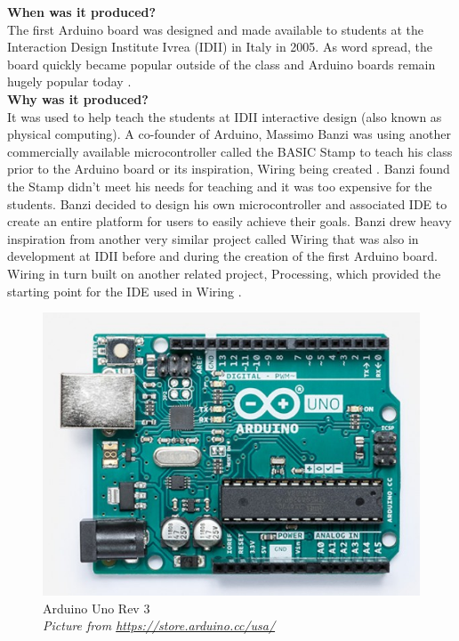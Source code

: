\textbf{When was it produced?}\\
The first Arduino board was designed and made available to students at the Interaction Design Institute Ivrea (IDII) in Italy in 2005. As word spread, the board quickly became popular outside of the class and Arduino boards remain hugely popular today 
\cite{RN103}.\\

\textbf{Why was it produced?}\\
It was used to help teach the students at IDII interactive design (also known as physical computing). A co-founder of Arduino, Massimo Banzi was using another commercially available microcontroller called the BASIC Stamp to teach his class prior to the Arduino board or its inspiration, Wiring being created 
\cite{RN103}. Banzi found the Stamp didn't meet his needs for teaching and it was too expensive for the students. Banzi decided to design his own microcontroller and associated IDE to create an entire platform for users to easily achieve their goals. Banzi drew heavy inspiration from another very similar project called Wiring that was also in development at IDII before and during the creation of the first Arduino board. Wiring in turn built on another related project, Processing, which provided the starting point for the IDE used in Wiring 
\cite{RN110}\cite{RN135} \cite{RN111}. \\

\begin{figure} \begin{center}
\includegraphics[width=.3\linewidth]{pics/Arduino_uno_3} 
\end{center} 
\caption{Arduino Uno Rev 3\\ \textit{\small{Picture from \url{https://store.arduino.cc/usa/}}}}
\label{ArduinoUno3}
\end{figure} 


